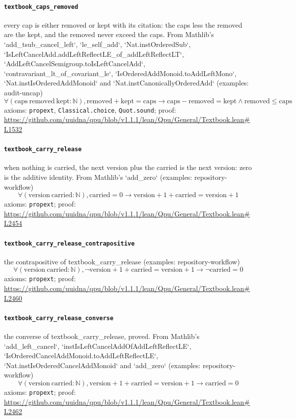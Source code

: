 \documentclass[11pt]{article}
\begin{document}
\paragraph{\texttt{textbook\_caps\_removed}}
every cap is either removed or kept with its citation: the caps less the removed are the kept, and the removed never exceed the caps. From Mathlib's `add\_tsub\_cancel\_left`, `le\_self\_add`, `Nat.instOrderedSub`, `IsLeftCancelAdd.addLeftReflectLE\_of\_addLeftReflectLT`, `AddLeftCancelSemigroup.toIsLeftCancelAdd`, `contravariant\_lt\_of\_covariant\_le`, `IsOrderedAddMonoid.toAddLeftMono`, `Nat.instIsOrderedAddMonoid` and `Nat.instCanonicallyOrderedAdd` (examples: audit-uncap)
\[ \forall (\mathrm{caps}\ \mathrm{removed}\ \mathrm{kept} : \mathbb{N}), \mathrm{removed} + \mathrm{kept} = \mathrm{caps} \to \mathrm{caps} - \mathrm{removed} = \mathrm{kept} \land \mathrm{removed} \le \mathrm{caps} \]
\noindent axioms: \texttt{propext}, \texttt{Classical.choice}, \texttt{Quot.sound}; proof: \url{https://github.com/uuidna/qpu/blob/v1.1.1/lean/Qpu/General/Textbook.lean\#L1532}

\paragraph{\texttt{textbook\_carry\_release}}
when nothing is carried, the next version plus the carried is the next version: zero is the additive identity. From Mathlib's `add\_zero` (examples: repository-workflow)
\[ \forall (\mathrm{version}\ \mathrm{carried} : \mathbb{N}), \mathrm{carried} = 0 \to \mathrm{version} + 1 + \mathrm{carried} = \mathrm{version} + 1 \]
\noindent axioms: \texttt{propext}; proof: \url{https://github.com/uuidna/qpu/blob/v1.1.1/lean/Qpu/General/Textbook.lean\#L2454}

\paragraph{\texttt{textbook\_carry\_release\_contrapositive}}
the contrapositive of textbook\_carry\_release (examples: repository-workflow)
\[ \forall (\mathrm{version}\ \mathrm{carried} : \mathbb{N}), \neg \mathrm{version} + 1 + \mathrm{carried} = \mathrm{version} + 1 \to \neg \mathrm{carried} = 0 \]
\noindent axioms: \texttt{propext}; proof: \url{https://github.com/uuidna/qpu/blob/v1.1.1/lean/Qpu/General/Textbook.lean\#L2460}

\paragraph{\texttt{textbook\_carry\_release\_converse}}
the converse of textbook\_carry\_release, proved. From Mathlib's `add\_left\_cancel`, `instIsLeftCancelAddOfAddLeftReflectLE`, `IsOrderedCancelAddMonoid.toAddLeftReflectLE`, `Nat.instIsOrderedCancelAddMonoid` and `add\_zero` (examples: repository-workflow)
\[ \forall (\mathrm{version}\ \mathrm{carried} : \mathbb{N}), \mathrm{version} + 1 + \mathrm{carried} = \mathrm{version} + 1 \to \mathrm{carried} = 0 \]
\noindent axioms: \texttt{propext}; proof: \url{https://github.com/uuidna/qpu/blob/v1.1.1/lean/Qpu/General/Textbook.lean\#L2462}
\end{document}
